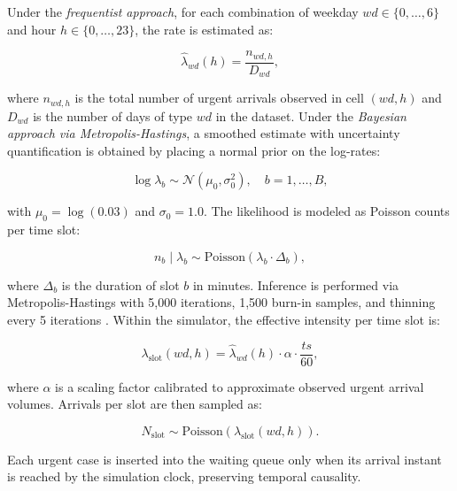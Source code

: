 \documentclass[sn-mathphys-num]{sn-jnl}
\begin{document}
\begin{itemize}
  Under the \textit{frequentist approach}, for each combination of
  weekday $wd \in \{0, \ldots, 6\}$ and hour $h \in \{0, \ldots, 23\}$,
  the rate is estimated as:

  \begin{equation}
  \hat{\lambda}_{wd}(h) = \frac{n_{wd,h}}{D_{wd}},
  \end{equation}

  where $n_{wd,h}$ is the total number of urgent arrivals observed in
  cell $(wd, h)$ and $D_{wd}$ is the number of days of type $wd$ in the
  dataset. Under the \textit{Bayesian approach via Metropolis-Hastings},
  a smoothed estimate with uncertainty quantification is obtained by
  placing a normal prior on the log-rates:

  \begin{equation}
  \log \lambda_b \sim \mathcal{N}(\mu_0, \sigma_0^2),
  \quad b = 1, \ldots, B,
  \end{equation}

  with $\mu_0 = \log(0.03)$ and $\sigma_0 = 1.0$. The likelihood is
  modeled as Poisson counts per time slot:

  \begin{equation}
  n_b \mid \lambda_b \sim \text{Poisson}(\lambda_b \cdot \Delta_b),
  \end{equation}

  where $\Delta_b$ is the duration of slot $b$ in minutes. Inference is
  performed via Metropolis-Hastings with 5{,}000 iterations, 1{,}500
  burn-in samples, and thinning every 5 iterations \cite{edition2013bayesian}. Within the simulator, the effective intensity per
  time slot is:

  \begin{equation}
  \lambda_{\text{slot}}(wd,h) = \hat{\lambda}_{wd}(h) \cdot \alpha
  \cdot \frac{ts}{60},
  \end{equation}

  where $\alpha$ is a scaling factor calibrated to approximate observed
  urgent arrival volumes. Arrivals per
  slot are then sampled as:


  \begin{equation}
  N_{\text{slot}} \sim
  \text{Poisson}\left(\lambda_{\text{slot}}(wd,h)\right).
  \end{equation}

  Each urgent case is inserted into the waiting queue only when its
  arrival instant is reached by the simulation clock, preserving
  temporal causality.


\end{itemize}
\end{document}
